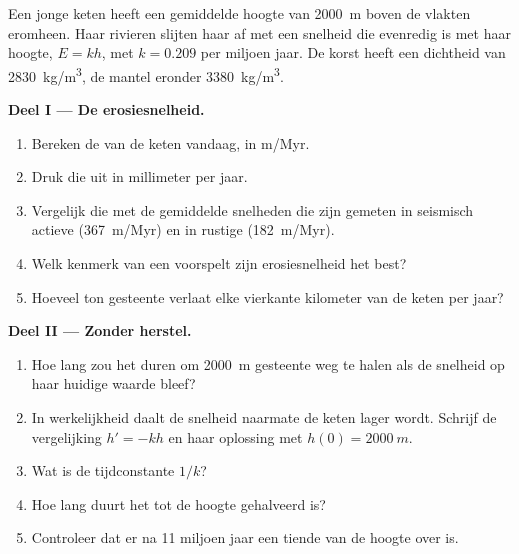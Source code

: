 \begin{problem}
\label{pb:g12:destruction-of-mountains:1}
Een jonge keten heeft een gemiddelde hoogte van \qty{2000}{m} boven de vlakten
eromheen. Haar rivieren slijten haar af met een snelheid die evenredig is met haar hoogte, $E = kh$,
met $k = 0.209$ per miljoen jaar. De korst heeft een dichtheid van
\qty{2830}{kg/m^3}, de mantel eronder \qty{3380}{kg/m^3}.

\medskip
\noindent\textbf{Deel I --- De erosiesnelheid.}
\begin{enumerate}
  \item Bereken de  van de keten vandaag, in \unit{m/Myr}.
  \item Druk die uit in millimeter per jaar.
  \item Vergelijk die met de gemiddelde snelheden die zijn gemeten in seismisch actieve 
        (\qty{367}{m/Myr}) en in rustige (\qty{182}{m/Myr}).
  \item Welk kenmerk van een  voorspelt zijn erosiesnelheid het best?
  \item Hoeveel ton gesteente verlaat elke vierkante kilometer van de keten
        per jaar?
\end{enumerate}

\medskip
\noindent\textbf{Deel II --- Zonder herstel.}
\begin{enumerate}[resume]
  \item Hoe lang zou het duren om \qty{2000}{m} gesteente weg te halen als de snelheid op haar
        huidige waarde bleef?
  \item In werkelijkheid daalt de snelheid naarmate de keten lager wordt. Schrijf de vergelijking
        $h' = -kh$ en haar oplossing met $h(0) = \qty{2000}{m}$.
  \item Wat is de tijdconstante $1/k$?
  \item Hoe lang duurt het tot de hoogte gehalveerd is?
  \item Controleer dat er na 11 miljoen jaar een tiende van de hoogte over is.
\end{enumerate}


\end{problem}
